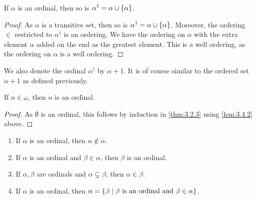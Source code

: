 \begin{lemma}
\label{lem:3.4.2}
If $ \alpha $ is an ordinal, then so is $ \alpha^\dagger = \alpha \cup \left\{ \alpha \right\} $.
\end{lemma}

\begin{proof}
As $ \alpha $ is a transitive set, then so is $ \alpha^\dagger = \alpha \cup \left\{ \alpha \right\} $. Moreover, the ordering $ \in $ restricted to $ \alpha^\dagger $ is an ordering. We have the ordering on $ \alpha $ with the extra element $ \alpha $ added on the end as the greatest element. This is a well ordering, as the ordering on $ \alpha $ is a well ordering.
\end{proof}

We also denote the ordinal $ \alpha^\dagger $ by $ \alpha + 1 $. It is of course similar to the ordered set $ \alpha + 1 $ as defined previously.

\begin{corollary}
If $ n \in \omega $, then $ n $ is an ordinal.
\end{corollary}

\begin{proof}
As $ \emptyset $ is an ordinal, this follows by induction in \ref{thm:3.2.3} using \ref{lem:3.4.2} above.
\end{proof}

\begin{proposition}
\label{prop:3.4.4}
\hfill
\begin{enumerate}
\item If $ \alpha $ is an ordinal, then $ \alpha \notin \alpha $.
\item If $ \alpha $ is an ordinal and $ \beta \in \alpha $, then $ \beta $ is an ordinal.
\item If $ \alpha, \beta $ are ordinals and $ \alpha \subsetneq \beta $, then $ \alpha \in \beta $.
\item If $ \alpha $ is an ordinal, then $ \alpha = \left\{ \beta \mid \beta \ \text{is an ordinal and} \ \beta \in \alpha \right\} $.
\end{enumerate}
\end{proposition}


